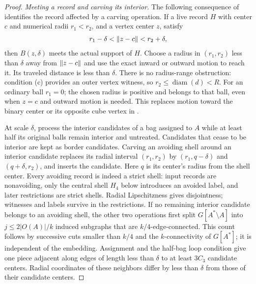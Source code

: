 \begin{proof}
\emph{Meeting a record and carving its interior.}
The following consequence of  identifies the record
affected by a carving operation.  If a live record $H$ with center
$c$ and numerical radii $r_1<r_2$, and a vertex center $z$, satisfy
\[
 r_1-\delta<\lVert z-c\rVert<r_2+\delta,
\]
then $B(z,\delta)$ meets the actual support of $H$.
Choose a radius in $(r_1,r_2)$
less than $\delta$ away from $\lVert z-c\rVert$ and use the exact inward
or outward motion to reach it.  Its traveled distance is less than
$\delta$.  There is no radius-range obstruction: condition (c)
provides an outer vertex witness, so $r_2\le\operatorname{diam}(d)<R$.
For an ordinary ball $r_1=0$; the chosen radius is positive and
belongs to that ball, even when $z=c$ and outward motion is needed.
This replaces motion toward the binary center or its opposite cube
vertex in \cite[Section B.4.3]{ThinTreesCompanion}.

At scale $\delta$, process the interior candidates of a bag assigned
to $A$ while at least half its original balls remain interior and
untreated.  Candidates that cease to be interior are kept as border
candidates.  Carving an avoiding shell around an interior candidate
replaces its radial interval $(r_1,r_2)$ by
$(r_1,q-\delta)$ and $(q+\delta,r_2)$, and inserts the candidate.
Here $q$ is its center's radius from the shell center.
Every avoiding record is indeed a strict shell: input records are
nonavoiding, only the central shell $H_4$ below introduces an
avoided label, and later restrictions are strict shells.
Radial Lipschitzness gives disjointness; witnesses and labels
survive in the restrictions.  If no remaining interior candidate
belongs to an avoiding shell, the other two operations first split
$G[A^*\setminus A]$ into $j\le2|O(A)|/k$ induced subgraphs
that are $k/4$-edge-connected.  This count follows by successive
cuts smaller than $k/4$ and the $k$-connectivity of $G[A^*]$;
it is independent of the embedding.  Assignment and the
half-bag loop condition give one piece adjacent along edges of
length less than $\delta$ to at least $3C_3$ candidate centers.
Radial coordinates of these neighbors differ by less than
$\delta$ from those of their candidate centers.


\end{proof}
